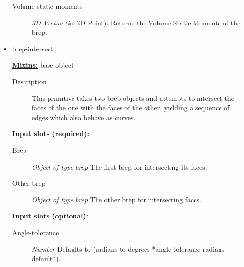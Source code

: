 \documentclass [11pt]{book}
\begin{document}
\begin{itemize}
\begin{description}
\item [Volume-static-moments]
\emph{3D Vector (i}e. 3D Point). Returns the Volume Static Moments of the brep.


\end{description}







\item {}brep-intersect


\textbf{
\underline{Mixins:}} base-object





\begin{description}

\item [
\underline{Description}]


This primitive takes two brep objects and attempts
to intersect the faces of the one with the faces of the other, yielding a 
sequence of edges which also behave as curves.



\end{description}








\textbf{
\underline{Input slots (required):}}

\begin{description}

\item [Brep]
\emph{Object of type brep} The first brep for intersecting its faces.


\item [Other-brep]
\emph{Object of type brep} The other brep for intersecting faces.


\end{description}






\textbf{
\underline{Input slots (optional):}}

\begin{description}

\item [Angle-tolerance]
\emph{Number} Defaults to (radians-to-degrees *angle-tolerance-radians-default*).



\end{description}
\end{itemize}
\end{document}
